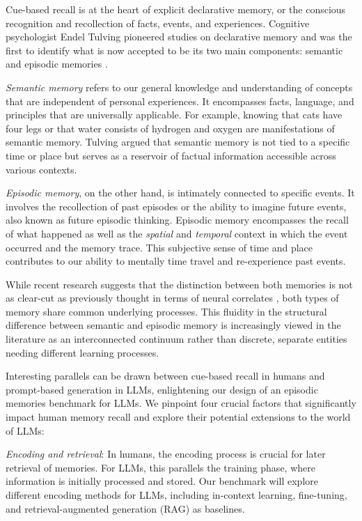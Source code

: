 \documentclass{article}
\begin{document}
Cue-based recall is at the heart of explicit declarative memory, or the conscious recognition and recollection of facts, events, and experiences. Cognitive psychologist Endel Tulving pioneered studies on declarative memory and was the first to identify what is now accepted to be its two main components: semantic and episodic memories \citep{Tulving1972}.

\textit{Semantic memory} refers to our general knowledge and understanding of concepts that are independent of personal experiences. It encompasses facts, language, and principles that are universally applicable. For example, knowing that cats have four legs or that water consists of hydrogen and oxygen are manifestations of semantic memory. Tulving argued that semantic memory is not tied to a specific time or place but serves as a reservoir of factual information accessible across various contexts. 

\textit{Episodic memory}, on the other hand, is intimately connected to specific events. It involves the recollection of past episodes or the ability to imagine future events, also known as future episodic thinking. Episodic memory encompasses the recall of what happened as well as the \textit{spatial} and \textit{temporal} context in which the event occurred and the memory trace. This subjective sense of time and place contributes to our ability to mentally time travel and re-experience past events.

While recent research suggests that the distinction between both memories is not as clear-cut as previously thought in terms of neural correlates \citep{De2022}, both types of memory share common underlying processes. This fluidity in the structural difference between semantic and episodic memory is increasingly viewed in the literature as an interconnected continuum rather than discrete, separate entities needing different learning processes.

Interesting parallels can be drawn between cue-based recall in humans and prompt-based generation in LLMs, enlightening our design of an episodic memories benchmark for LLMs. We pinpoint four crucial factors that significantly impact human memory recall and explore their potential extensions to the world of LLMs:

\textit{Encoding and retrieval}: In humans, the encoding process is crucial for later retrieval of memories. For LLMs, this parallels the training phase, where information is initially processed and stored. Our benchmark will explore different encoding methods for LLMs, including in-context learning, fine-tuning, and retrieval-augmented generation (RAG) as baselines.
\end{document}
